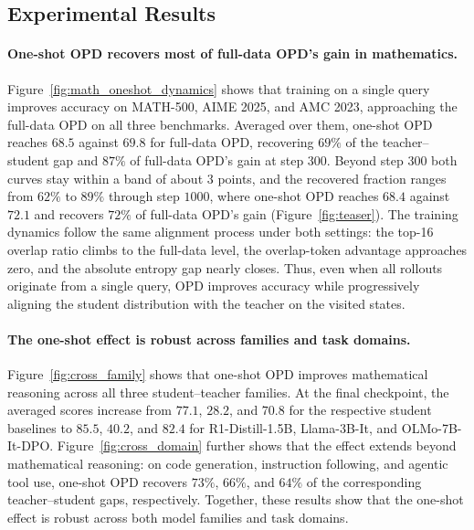 \subsection{Experimental Results}
\label{sec:finding-recovery}

\paragraph{One-shot OPD recovers most of full-data OPD's gain in mathematics.}

Figure~\ref{fig:math_oneshot_dynamics} shows that training on a single query improves accuracy on MATH-500, AIME 2025, and AMC 2023, approaching the full-data OPD on all three benchmarks. Averaged over them, one-shot OPD reaches \(68.5\) against \(69.8\) for full-data OPD, recovering \(69\%\) of the teacher--student gap and \(87\%\) of full-data OPD's gain at step 300. Beyond step \(300\) both curves stay within a band of about \(3\) points, and the recovered fraction ranges from \(62\%\) to \(89\%\) through step \(1000\), where one-shot OPD reaches \(68.4\) against \(72.1\) and recovers \(72\%\) of full-data OPD's gain (Figure~\ref{fig:teaser}). The training dynamics follow the same alignment process under both settings: the top-16 overlap ratio climbs to the full-data level, the overlap-token advantage approaches zero, and the absolute entropy gap nearly closes. Thus, even when all rollouts originate from a single query, OPD improves accuracy while progressively aligning the student distribution with the teacher on the visited states.


\paragraph{The one-shot effect is robust across families and task domains.}
\label{sec:one-shot-robust}
Figure~\ref{fig:cross_family} shows that one-shot OPD improves mathematical reasoning across all three student--teacher families. At the final checkpoint, the averaged scores increase from \(77.1\), \(28.2\), and \(70.8\) for the respective student baselines to \(85.5\), \(40.2\), and \(82.4\) for R1-Distill-1.5B, Llama-3B-It, and OLMo-7B-It-DPO. Figure~\ref{fig:cross_domain} further shows that the effect extends beyond mathematical reasoning: on code generation, instruction following, and agentic tool use, one-shot OPD recovers \(73\%\), \(66\%\), and \(64\%\) of the corresponding teacher--student gaps, respectively. Together, these results show that the one-shot effect is robust across both model families and task domains.


